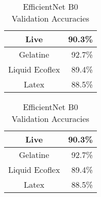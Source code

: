 \begin{table}[htb]
\centering

\begin{minipage}[c]{0.4\textwidth}
\centering

    \begin{tabular}{ c   r } \hline
        Live               & 90.3\% \\ \hline
        Gelatine           & 92.7\% \\
        Liquid Ecoflex    & 89.4\% \\
        Latex              & 88.5\% \\ \hline
    \end{tabular}
\end{minipage}
\hspace{10mm}
\begin{minipage}[c]{0.4\textwidth}
\centering

    \begin{tabular}{ c   r } \hline
        Live               & 90.3\% \\ \hline
        Gelatine           & 92.7\% \\
        Liquid Ecoflex    & 89.4\% \\
        Latex              & 88.5\% \\ \hline
    \end{tabular}

\end{minipage}

\caption{EfficientNet B0 Validation Accuracies}
\label{tbl:efficientnet}
\end{table}






